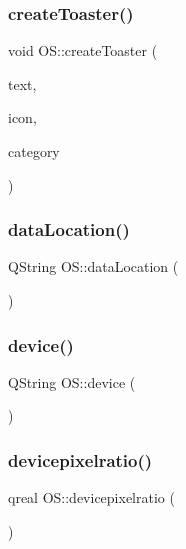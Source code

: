 \subsubsection{\texorpdfstring{create\+Toaster()}{createToaster()}}
{\footnotesize\ttfamily void O\+S\+::create\+Toaster (\begin{DoxyParamCaption}\item[{Q\+String}]{text,  }\item[{Q\+String}]{icon,  }\item[{Q\+String}]{category }\end{DoxyParamCaption})}

\mbox{\label{classOS_ae8a69330410d1b615443920baa19cea7}} 
\subsubsection{\texorpdfstring{data\+Location()}{dataLocation()}}
{\footnotesize\ttfamily Q\+String O\+S\+::data\+Location (\begin{DoxyParamCaption}{ }\end{DoxyParamCaption})}

\mbox{\label{classOS_a800e819bbb7aa20945893d138b2a1bb3}} 
\subsubsection{\texorpdfstring{device()}{device()}}
{\footnotesize\ttfamily Q\+String O\+S\+::device (\begin{DoxyParamCaption}{ }\end{DoxyParamCaption})}

\mbox{\label{classOS_abec33b96eb8c7def86f6f918dc1849c0}} 
\subsubsection{\texorpdfstring{devicepixelratio()}{devicepixelratio()}}
{\footnotesize\ttfamily qreal O\+S\+::devicepixelratio (\begin{DoxyParamCaption}{ }\end{DoxyParamCaption})}


